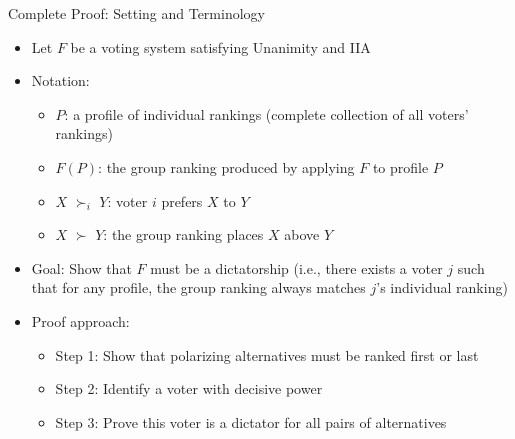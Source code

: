 \documentclass[10pt]{beamer}
\begin{document}
\begin{frame}{Complete Proof: Setting and Terminology}
  \begin{itemize}[<+->]
    \item Let $F$ be a voting system satisfying Unanimity and IIA
    \item Notation:
      \begin{itemize}
        \item $P$: a profile of individual rankings (complete collection of all voters' rankings)
        \item $F(P)$: the group ranking produced by applying $F$ to profile $P$
        \item $X$ $\succ_i$ $Y$: voter $i$ prefers $X$ to $Y$
        \item $X$ $\succ$ $Y$: the group ranking places $X$ above $Y$
      \end{itemize}
    \item Goal: Show that $F$ must be a dictatorship (i.e., there exists a voter $j$ such that for any profile, the group ranking always matches $j$'s individual ranking)
    \item Proof approach: 
      \begin{itemize}
        \item Step 1: Show that polarizing alternatives must be ranked first or last
        \item Step 2: Identify a voter with decisive power
        \item Step 3: Prove this voter is a dictator for all pairs of alternatives
      \end{itemize}
  \end{itemize}
\end{frame}
\end{document}
